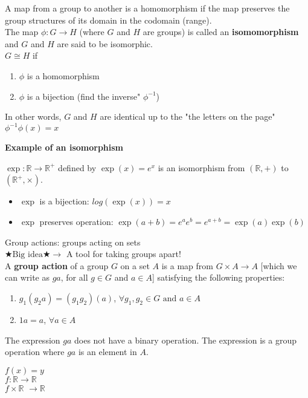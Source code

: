 \documentclass{article}
\begin{document}
A map from a group to another is a homomorphism if the map preserves the group structures of its domain in the codomain (range).\\[0.5cm]

 The map \(\phi:G \xrightarrow{}H\) (where \(G\) and \(H\) are groups) is called an \textbf{isomomorphism} and \(G\) and \(H\) are said to be isomorphic.\\
\(G \cong H\) if
\begin{enumerate}
    \item \(\phi\) is a homomorphism
    \item \(\phi\) is a bijection (find the inverse" \(\phi^{-1}\))
\end{enumerate}
In other words, \(G\) and \(H\) are identical up to the "the letters on the page" \(\phi^{-1}\phi(x)=x\)\\[0.5cm]

\centerline{\textbf{Example of an isomorphism}}
\(\exp:\mathbb{R} \xrightarrow{} \mathbb{R}^+\) defined by \(\exp(x)=e^x\) is an isomorphism from \((\mathbb{R},+)\) to \((\mathbb{R^+},\times)\).
\begin{itemize}
    \item \(\exp\) is a bijection: \(log(\exp(x))=x\)
    \item \(\exp\) preserves operation: \(\exp(a+b)=e^ae^b=e^{a+b}=\exp(a)\exp(b)\)\\[0.5cm]
\end{itemize}

 Group actions: groups acting on sets\\
\(\bigstar \text{Big idea} \bigstar \xrightarrow{}\) A tool for taking groups apart!\\
A \textbf{group action} of a group \(G\) on a set \(A\) is a map from \(G \times A \xrightarrow{} A\) [which we can write as \(ga\), for all \(g \in G\) and \(a \in A\)] satisfying the following properties:
\begin{enumerate}
    \item \(g_1(g_2a)=(g_1g_2)(a)\), \(\forall g_1,g_2 \in G \text{ and  } a \in A\)
    \item \(1a=a\), \(\forall a \in A\)
\end{enumerate}
The expression \(ga\) does not have a binary operation. The expression is a group operation where \(ga\) is an element in \(A\).
\begin{center}
    \(f(x)=y\)\\
    \(f:\mathbb{R} \xrightarrow{} \mathbb{R}\)\\
    \(f \times \mathbb{R}\) \(\xrightarrow{} \mathbb{R}\)
\end{center}
\end{document}
